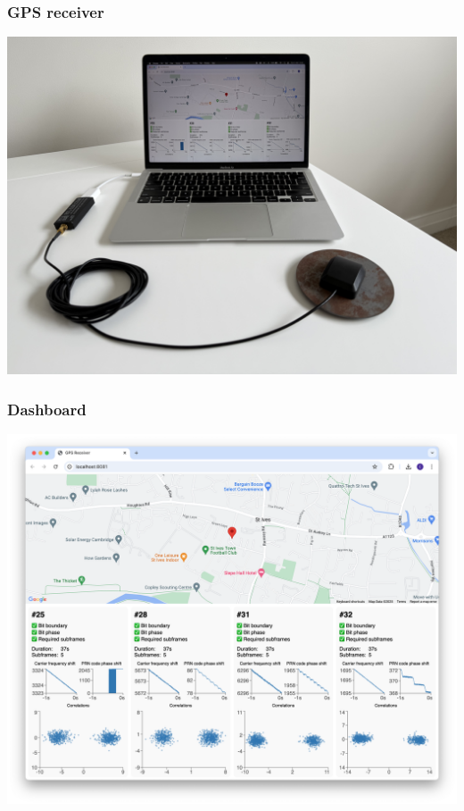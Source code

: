 \documentclass[aspectratio=169, xcolor=table]{beamer}
\begin{document}
\begin{frame}
    \frametitle{GPS receiver}

    \centering
    \includegraphics[width=\textwidth * 3 / 5]{9 setup.jpg}
\end{frame}

\begin{frame}
    \frametitle{Dashboard}

    \centering
    \includegraphics[width=\textwidth * 11 / 20]{10 dashboard.png}
\end{frame}
\end{document}
